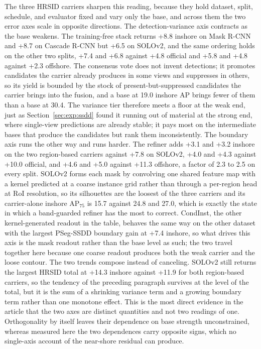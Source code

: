 The three HRSID carriers sharpen this reading, because they hold dataset, split, schedule, and evaluator fixed and vary only the base, and across them the two error axes scale in opposite directions. The detection-variance axis contracts as the base weakens. The training-free stack returns +8.8 inshore on Mask R-CNN and +8.7 on Cascade R-CNN but +6.5 on SOLOv2, and the same ordering holds on the other two splits, +7.4 and +6.8 against +4.8 official and +5.8 and +4.8 against +2.3 offshore. The consensus vote does not invent detections; it promotes candidates the carrier already produces in some views and suppresses in others, so its yield is bounded by the stock of present-but-suppressed candidates the carrier brings into the fusion, and a base at 19.0 inshore AP brings fewer of them than a base at 30.4. The variance tier therefore meets a floor at the weak end, just as Section~\ref{sec:exp:ssdd} found it running out of material at the strong end, where single-view predictions are already stable; it pays most on the intermediate bases that produce the candidates but rank them inconsistently. The boundary axis runs the other way and runs harder. The refiner adds +3.1 and +3.2 inshore on the two region-based carriers against +7.8 on SOLOv2, +4.0 and +4.3 against +10.0 official, and +4.6 and +5.0 against +11.3 offshore, a factor of 2.3 to 2.5 on every split. SOLOv2 forms each mask by convolving one shared feature map with a kernel predicted at a coarse instance grid rather than through a per-region head at RoI resolution, so its silhouettes are the loosest of the three carriers and its carrier-alone inshore AP$_{75}$ is 15.7 against 24.8 and 27.0, which is exactly the state in which a band-guarded refiner has the most to correct. CondInst, the other kernel-generated readout in the table, behaves the same way on the other dataset with the largest PSeg-SSDD boundary gain at +7.4 inshore, so what drives this axis is the mask readout rather than the base level as such; the two travel together here because one coarse readout produces both the weak carrier and the loose contour. The two trends compose instead of canceling. SOLOv2 still returns the largest HRSID total at +14.3 inshore against +11.9 for both region-based carriers, so the tendency of the preceding paragraph survives at the level of the total, but it is the sum of a shrinking variance term and a growing boundary term rather than one monotone effect. This is the most direct evidence in the article that the two axes are distinct quantities and not two readings of one. Orthogonality by itself leaves their dependence on base strength unconstrained, whereas measured here the two dependences carry opposite signs, which no single-axis account of the near-shore residual can produce.

